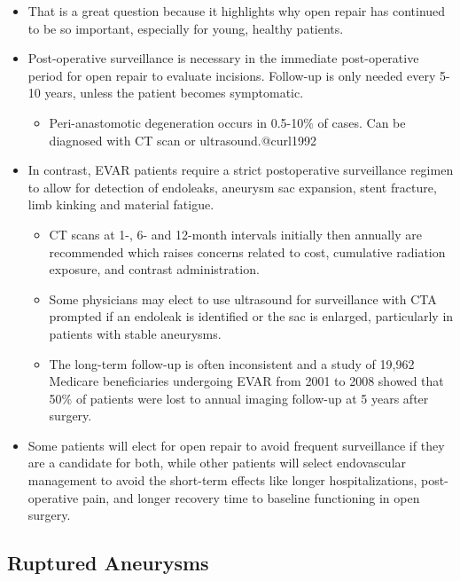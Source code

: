 \documentclass[
]{book}
\providecommand{\tightlist}{%
  \setlength{\itemsep}{0pt}\setlength{\parskip}{0pt}}
\begin{document}
\begin{itemize}
\item
  That is a great question because it highlights why open repair has
  continued to be so important, especially for young, healthy
  patients.
\item
  Post-operative surveillance is necessary in the immediate
  post-operative period for open repair to evaluate incisions.
  Follow-up is only needed every 5-10 years, unless the patient
  becomes symptomatic.

  \begin{itemize}
  \tightlist
  \item
    Peri-anastomotic degeneration occurs in 0.5-10\% of cases. Can be
    diagnosed with CT scan or ultrasound.@curl1992
  \end{itemize}
\item
  In contrast, EVAR patients require a strict postoperative
  surveillance regimen to allow for detection of endoleaks, aneurysm
  sac expansion, stent fracture, limb kinking and material fatigue.

  \begin{itemize}
  \item
    CT scans at 1-, 6- and 12-month intervals initially then
    annually are recommended which raises concerns related to cost,
    cumulative radiation exposure, and contrast administration.
  \item
    Some physicians may elect to use ultrasound for surveillance
    with CTA prompted if an endoleak is identified or the sac is
    enlarged, particularly in patients with stable aneurysms.
  \item
    The long-term follow-up is often inconsistent and a study of
    19,962 Medicare beneficiaries undergoing EVAR from 2001 to 2008
    showed that 50\% of patients were lost to annual imaging
    follow-up at 5 years after
    surgery.\citep{schanzerFollowUpComplianceEndovascular2015}
  \end{itemize}
\item
  Some patients will elect for open repair to avoid frequent
  surveillance if they are a candidate for both, while other patients
  will select endovascular management to avoid the short-term effects
  like longer hospitalizations, post-operative pain, and longer
  recovery time to baseline functioning in open surgery.
\end{itemize}

\hypertarget{ruptured-aneurysms}{%
\subsection{Ruptured Aneurysms}\label{ruptured-aneurysms}}
\end{document}
